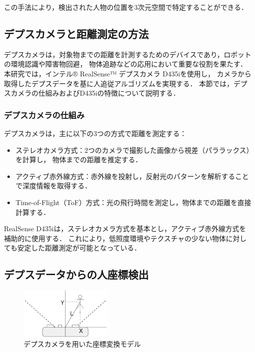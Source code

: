 この手法により，検出された人物の位置を3次元空間で特定することができる．


\subsection{デプスカメラと距離測定の方法}
デプスカメラは，対象物までの距離を計測するためのデバイスであり，ロボットの環境認識や障害物回避，
物体追跡などの応用において重要な役割を果たす．
本研究では，インテル® RealSense™ デプスカメラ D435iを使用し，
カメラから取得したデプスデータを基に人追従アルゴリズムを実現する．
本節では，デプスカメラの仕組みおよびD435iの特徴について説明する．

\subsubsection{デプスカメラの仕組み}
デプスカメラは，主に以下の3つの方式で距離を測定する：
\begin{itemize}
    \item ステレオカメラ方式：2つのカメラで撮影した画像から視差（パララックス）を計算し，
          物体までの距離を推定する．
    \item アクティブ赤外線方式：赤外線を投射し，反射光のパターンを解析することで深度情報を取得する．
    \item Time-of-Flight（ToF）方式：光の飛行時間を測定し，物体までの距離を直接計算する．
\end{itemize}

RealSense D435iは，ステレオカメラ方式を基本とし，アクティブ赤外線方式を補助的に使用する．
これにより，低照度環境やテクスチャの少ない物体に対しても安定した距離測定が可能となっている．

\subsection{デプスデータからの人座標検出}

\begin{figure}[h]
    \centering
    \includegraphics[width=0.4\textwidth]{figure/rialsens_man.pdf}
    \caption{デプスカメラを用いた座標変換モデル}
    \label{fig:coordinate_conversion}
\end{figure}

